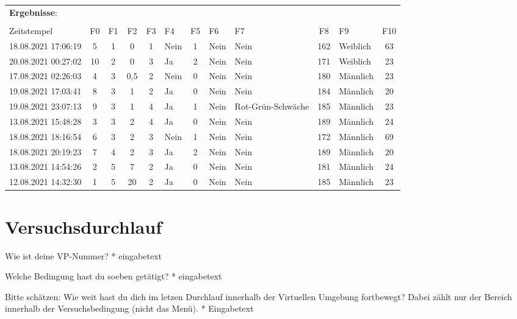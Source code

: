 \begin{landscape}
\begin{table}[]
\centering
\begin{tabular}{lcccclcllclc}
\textbf{Ergebnisse}: \\ \\
Zeitstempel         & F0 & F1 & F2  & F3 & F4   & F5                                     & F6   & F7                & F8  & F9       & F10 \\
18.08.2021 17:06:19 & 5  & 1  & 0   & 1  & Nein & 1 & Nein & Nein              & 162 & Weiblich & 63  \\
20.08.2021 00:27:02 & 10 & 2  & 0   & 3  & Ja   & 2 & Nein & Nein              & 171 & Weiblich & 23  \\
17.08.2021 02:26:03 & 4  & 3  & 0,5 & 2  & Nein & 0 & Nein & Nein              & 180 & Männlich & 23  \\
19.08.2021 17:03:41 & 8  & 3  & 1   & 2  & Ja   & 0 & Nein & Nein              & 184 & Männlich & 20  \\
19.08.2021 23:07:13 & 9  & 3  & 1   & 4  & Ja   & 1 & Nein & Rot-Grün-Schwäche & 185 & Männlich & 23  \\
13.08.2021 15:48:28 & 3  & 3  & 2   & 4  & Ja   & 0 & Nein & Nein              & 189 & Männlich & 24  \\
18.08.2021 18:16:54 & 6  & 3  & 2   & 3  & Nein & 1 & Nein & Nein              & 172 & Männlich & 69  \\
18.08.2021 20:19:23 & 7  & 4  & 2   & 3  & Ja   & 2 & Nein & Nein              & 189 & Männlich & 20  \\
13.08.2021 14:54:26 & 2  & 5  & 7   & 2  & Ja   & 0 & Nein & Nein              & 181 & Männlich & 24  \\
12.08.2021 14:32:30 & 1  & 5  & 20  & 2  & Ja   & 0 & Nein & Nein              & 185 & Männlich & 23
\end{tabular}
\end{table}
\end{landscape}

\section*{Versuchsdurchlauf}
Wie ist deine VP-Nummer? *
eingabetext

Welche Bedingung hast du soeben getätigt? *
eingabetext

Bitte schätzen: Wie weit hast du dich im letzen Durchlauf innerhalb der Virtuellen Umgebung fortbewegt? Dabei zählt nur der Bereich innerhalb der Versuchsbedingung (nicht das Menü). *
Eingabetext

